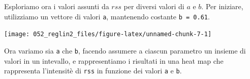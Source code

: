 \documentclass[
  10pt,
  italian,
  a4paper,
  extrafontsizes,onecolumn,openright
  ]{memoir}
\newenvironment{Shaded}{\begin{snugshade}}{\end{snugshade}}
\newcommand{\AttributeTok}[1]{\textcolor[rgb]{0.77,0.63,0.00}{#1}}
\newcommand{\CommentTok}[1]{\textcolor[rgb]{0.56,0.35,0.01}{\textit{#1}}}
\newcommand{\DecValTok}[1]{\textcolor[rgb]{0.00,0.00,0.81}{#1}}
\newcommand{\FloatTok}[1]{\textcolor[rgb]{0.00,0.00,0.81}{#1}}
\newcommand{\FunctionTok}[1]{\textcolor[rgb]{0.00,0.00,0.00}{#1}}
\newcommand{\NormalTok}[1]{#1}
\newcommand{\SpecialCharTok}[1]{\textcolor[rgb]{0.00,0.00,0.00}{#1}}
\newcommand{\StringTok}[1]{\textcolor[rgb]{0.31,0.60,0.02}{#1}}
\begin{document}
Esploriamo ora i valori assunti da \(rss\) per diversi valori di \(a\) e \(b\). Per iniziare, utilizziamo un vettore di valori \texttt{a}, mantenendo costante \texttt{b\ =\ 0.61}.

\begin{Shaded}
\end{Shaded}

\begin{center}\texttt{[image: 052\_reglin2\_files/figure-latex/unnamed-chunk-7-1]} \end{center}

Ora variamo sia \texttt{a} che \texttt{b}, facendo assumere a ciascun parametro un insieme di valori in un intevallo, e rappresentiamo i risultati in una heat map che rappresenta l'intensitè di \texttt{rss} in funzione dei valori \texttt{a} e \texttt{b}.
\end{document}
